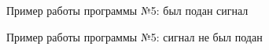 \documentclass[12pt]{report}
\begin{document}
\begin{figure}[H]
	\caption{Пример работы программы №5: был подан сигнал}
	\label{ris:task5-1}
\end{figure}
\begin{figure}[H]
	\caption{Пример работы программы №5: сигнал не был подан}
	\label{ris:task5-2}
\end{figure}
\newpage
\end{document}
